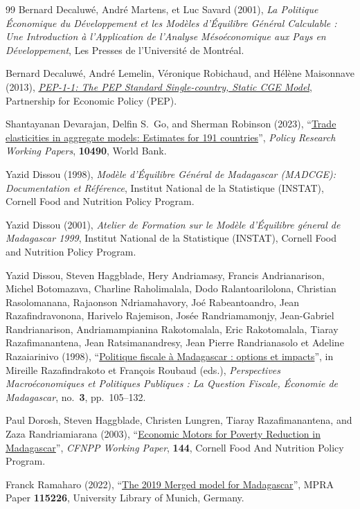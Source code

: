 \documentclass[11pt,a4paper]{article}
\begin{document}
	\begin{thebibliography}{99}	
		\setlength{\itemsep}{0.25cm}
		Bernard Decaluwé, André Martens, et Luc Savard (2001), \textit{La Politique Économique du Développement et les Modèles d'Équilibre Général Calculable : Une Introduction à l'Application de l'Analyse Mésoéconomique aux Pays en Développement}, Les Presses de l'Université de Montréal.
		
		
		Bernard Decaluwé, André Lemelin, Véronique Robichaud, and Hélène Maisonnave (2013), \href{https://www.pep-net.org/research-resources/cge-models}{\textit{{PEP-1-1}: The PEP Standard Single-country, Static CGE Model}}, Partnership for Economic Policy (PEP).
		
		Shantayanan Devarajan, Delfin S.~Go, and Sherman Robinson (2023), ``\href{http://hdl.handle.net/10986/39981}{Trade elasticities in aggregate models: Estimates for 191 countries}'', \textit{Policy Research Working Papers}, \textbf{10490}, World Bank. 
		
		
		Yazid Dissou (1998), \textit{Modèle d'Équilibre Général de Madagascar (MADCGE): Documentation et Référence}, Institut National de la Statistique (INSTAT), Cornell Food and Nutrition Policy Program.
		
		Yazid Dissou (2001), \textit{Atelier de Formation sur le Modèle d'Équilibre géneral de Madagascar 1999}, Institut National de la Statistique (INSTAT), Cornell Food and Nutrition Policy Program.
		
		Yazid Dissou, Steven Haggblade, Hery Andriamasy, Francis Andrianarison, Michel Botomazava, Charline Raholimalala, Dodo Ralantoarilolona, Christian Rasolomanana, Rajaonson Ndriamahavory, Joé Rabeantoandro, Jean Razafindravonona, Harivelo Rajemison, Josée Randriamamonjy, Jean-Gabriel Randrianarison, Andriamampianina Rakotomalala, Eric Rakotomalala, Tiaray Razafimanantena, Jean Ratsimanandresy, Jean Pierre Randrianasolo et Adeline Razaiarinivo (1998), ``\href{https://www.documentation.ird.fr/hor/fdi:010019178}{Politique fiscale à Madagascar : options et impacts}'', in Mireille Razafindrakoto et François Roubaud (eds.), \textit{Perspectives Macroéconomiques et Politiques Publiques : La Question Fiscale, Économie de Madagascar}, no.~\textbf{3}, pp.~105--132. 
		
		
		Paul Dorosh, Steven Haggblade, Christen Lungren, Tiaray Razafimanantena, and Zaza Randriamiarana (2003), ``\href{https://www.cfnpp.cornell.edu/images/wp144en.pdf}{Economic Motors for Poverty Reduction in Madagascar}'', \textit{CFNPP Working Paper}, \textbf{144}, Cornell Food And Nutrition Policy Program.
		
		 Franck Ramaharo (2022), ``\href{https://mpra.ub.uni-muenchen.de/id/eprint/115226}{The 2019 Merged model for Madagascar}'', MPRA Paper \textbf{115226}, University Library of Munich, Germany. 
	\end{thebibliography}	
	
\end{document}

